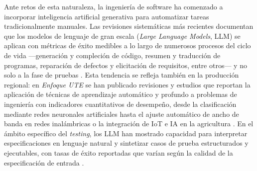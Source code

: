 \documentclass[10pt,journal,twoside,letterpaper]{IEEEtran}
\begin{document}
	Ante retos de esta naturaleza, la ingeniería de software ha comenzado a incorporar inteligencia artificial generativa para automatizar tareas tradicionalmente manuales. Las revisiones sistemáticas más recientes documentan que los modelos de lenguaje de gran escala (\emph{Large Language Models}, LLM) se aplican con métricas de éxito medibles a lo largo de numerosos procesos del ciclo de vida ---generación y compleción de código, resumen y traducción de programas, reparación de defectos y elicitación de requisitos, entre otros--- y no solo a la fase de pruebas \cite{hou2024llm4se,carleton2024genai}. Esta tendencia se refleja también en la producción regional: en \emph{Enfoque UTE} se han publicado revisiones y estudios que reportan la aplicación de técnicas de aprendizaje automático y profundo a problemas de ingeniería con indicadores cuantitativos de desempeño, desde la clasificación mediante redes neuronales artificiales \cite{molina2024ann} hasta el ajuste automático de ancho de banda en redes inalámbricas \cite{carrillo2025ai} o la integración de IoT e IA en la agricultura \cite{basurto2026iotai}. En el ámbito específico del \emph{testing}, los LLM han mostrado capacidad para interpretar especificaciones en lenguaje natural y sintetizar casos de prueba estructurados y ejecutables, con tasas de éxito reportadas que varían según la calidad de la especificación de entrada \cite{wang2024survey,yang2024evaluation,rehan2025harnessing,bhatia2024unit,korraprolu2025testcase,takerngsaksiri2025pytester}.
\end{document}
